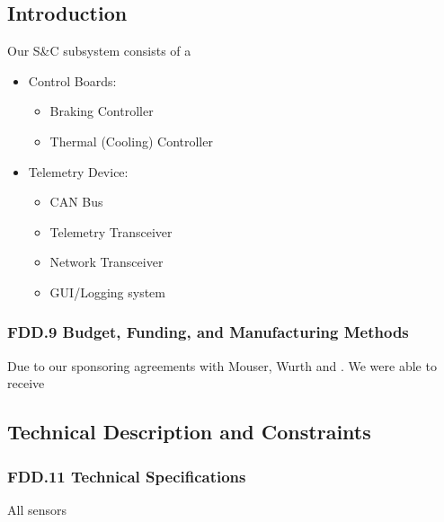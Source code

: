 

\subsection{Introduction}
Our S\&C subsystem consists of a 
\begin{itemize}
    \item Control Boards: \begin{itemize}
            \item Braking Controller
            \item Thermal (Cooling) Controller
    \end{itemize}

    \item Telemetry Device: \begin{itemize}
            \item CAN Bus
            \item Telemetry Transceiver
            \item Network Transceiver
            \item GUI/Logging system
    \end{itemize}

\end{itemize}

\subsubsection{FDD.9 Budget, Funding, and Manufacturing Methods}
Due to our sponsoring agreements with Mouser, Wurth and . We were able to receive
 
\subsection{Technical Description and Constraints}
\subsubsection{FDD.11 Technical Specifications}
All sensors 

